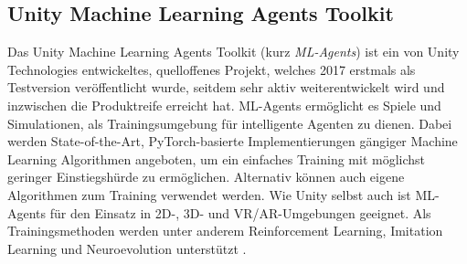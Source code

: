 \subsection{Unity Machine Learning Agents Toolkit}
Das Unity Machine Learning Agents Toolkit (kurz \emph{ML-Agents}) ist ein von Unity Technologies entwickeltes, quelloffenes Projekt, welches 2017 erstmals als Testversion veröffentlicht wurde, seitdem sehr aktiv weiterentwickelt wird und inzwischen die Produktreife erreicht hat.
ML-Agents ermöglicht es Spiele und Simulationen, als Trainingsumgebung für intelligente Agenten zu dienen.
Dabei werden State-of-the-Art, PyTorch-basierte Implementierungen gängiger Machine Learning Algorithmen angeboten, um ein einfaches Training mit möglichst geringer Einstiegshürde zu ermöglichen.
Alternativ können auch eigene Algorithmen zum Training verwendet werden.
Wie Unity selbst auch ist ML-Agents für den Einsatz in 2D-, 3D- und VR/AR-Umgebungen geeignet.
Als Trainingsmethoden werden unter anderem Reinforcement Learning, Imitation Learning und Neuroevolution unterstützt \cite{mlagentsDocHome}.


